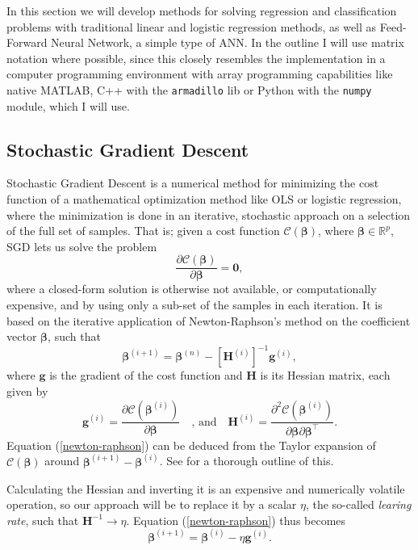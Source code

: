 \documentclass[]{article}
\begin{document}
In this section we will develop methods for solving regression and classification problems with traditional linear and logistic regression methods, as well as Feed-Forward Neural Network, a simple type of ANN. In the outline I will use matrix notation where possible, since this closely resembles the implementation in a computer programming environment with array programming capabilities like native MATLAB, C++ with the \lstinline|armadillo| lib or Python with the \lstinline|numpy| module, which I will use.

\subsection{Stochastic Gradient Descent}
Stochastic Gradient Descent is a numerical method for minimizing the cost function of a mathematical optimization method like OLS or logistic regression, where the minimization is done in an iterative, stochastic approach on a selection of the full set of samples. That is; given a cost function $\mathcal{C}(\mathbf{\beta})$, where $\mathbf{\beta} \in \mathbb{R}^p$, SGD lets us solve the problem
\begin{equation}
	\frac{\partial \mathcal{C}(\mathbf{\beta})}{\partial \mathbf{\beta}} = \mathbf{0},
\end{equation}
where a closed-form solution is otherwise not available, or computationally expensive, and by using only a sub-set of the samples in each iteration. It is based on the iterative application of Newton-Raphson's method on the coefficient vector $\mathbf{\beta}$, such that
\begin{equation} \label{newton-raphson}
	\mathbf{\beta}^{(i+1)} = \mathbf{\beta}^{(n)} - [\mathbf{H}^{(i)}]^{-1}\mathbf{g}^{(i)},
\end{equation}
where $\mathbf{g}$ is the gradient of the cost function and $\mathbf{H}$ is its Hessian matrix, each given by
\begin{equation}
	\mathbf{g}^{(i)} = \frac{\partial \mathcal{C}(\mathbf{\beta}^{(i)})}{\partial \mathbf{\beta}} \quad \text{, and} \quad 
	\mathbf{H}^{(i)} = \frac{\partial^2 \mathcal{C}(\mathbf{\beta}^{(i)})}{\partial \mathbf{\beta} \partial \mathbf{\beta}^\intercal}.
\end{equation}
Equation (\ref{newton-raphson}) can be deduced from the Taylor expansion of $\mathcal{C}(\mathbf{\beta})$ around $\mathbf{\beta}^{(i+1)} - \mathbf{\beta}^{(i)}$. See \cite{fys-stk4155-notes} for a thorough outline of this.

Calculating the Hessian and inverting it is an expensive and numerically volatile operation, so our approach will be to replace it by a scalar $\eta$, the so-called \textit{learing rate}, such that $\mathbf{H}^{-1} \rightarrow \eta$. Equation (\ref{newton-raphson}) thus becomes
\begin{equation} \label{newton-raphson-eta}
	\mathbf{\beta}^{(i+1)} = \mathbf{\beta}^{(i)} - \eta \mathbf{g}^{(i)}.
\end{equation}
\end{document}
